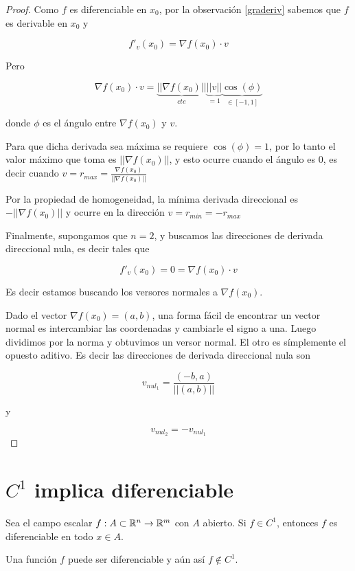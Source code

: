\begin{proof}

Como $f$ es diferenciable en $x_0$, por la observación \ref{graderiv} sabemos que $f$ es derivable en $x_0$ y

$$ f'_v(x_0) = \nabla f(x_0) \cdot v $$

Pero

\[ \nabla f(x_0) \cdot v = \underbrace{|| \nabla f(x_0)||}_{cte} \underbrace{||v||}_{=1} \underbrace{\cos(\phi)}_{\in [-1,1]} \]

donde $\phi$ es el ángulo entre $\nabla f(x_0)$ y $v$.

Para que dicha derivada sea máxima se requiere $ \cos(\phi) = 1$, por lo tanto el valor máximo que toma es $ || \nabla f(x_0)||$, y esto ocurre cuando el ángulo es 0, es decir cuando $v = r_{max} = \frac{\nabla f(x_0)}{||\nabla f(x_0)||}$

Por la propiedad de homogeneidad, la mínima derivada direccional es $ - || \nabla f(x_0)||$ y ocurre en la dirección $v = r_{min} = - r_{max}$

Finalmente, supongamos que $n=2$, y buscamos las direcciones de derivada direccional nula, es decir tales que

$$ f'_v(x_0) = 0 = \nabla f(x_0) \cdot v$$

Es decir estamos buscando los versores normales a $\nabla f(x_0)$.  

Dado el vector $\nabla f(x_0) = (a,b)$, una forma fácil de encontrar un vector normal es intercambiar las coordenadas y cambiarle el signo a una.  Luego dividimos por la norma y obtuvimos un versor normal.  El otro es símplemente el opuesto aditivo.  Es decir las direcciones de derivada direccional nula son

$$ v_{nul_1} = \frac{(-b,a)}{||(a,b)||} $$

y 

$$ v_{nul_2} = - v_{nul_1} $$
\end{proof}

\section{$C^1$ implica diferenciable}

\begin{theorem}
Sea el campo escalar $ f : A \subset \mathbb{R}^n \to \mathbb{R}^m$ con $A$ abierto.
Si $ f \in C^1$, entonces $f$ es diferenciable en todo $x \in A$.
\end{theorem}

\begin{observation}
Una función $f$ puede ser diferenciable y aún así $ f \not\in C^1$.
\end{observation}

